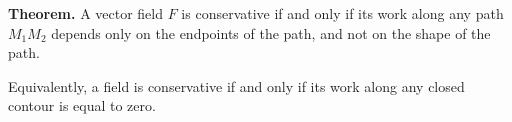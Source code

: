 \textbf{Theorem.} A vector field $F$ is conservative if and only if its work along any path $M_1 M_2$ depends only on the endpoints of the path, and not on the shape of the path.

Equivalently, a field is conservative if and only if its work along any closed contour is equal to zero.
